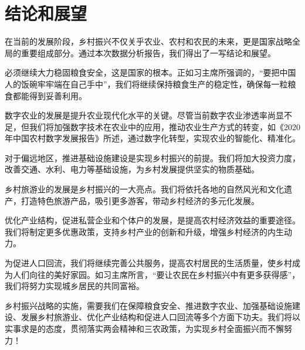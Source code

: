 \chapter{结论和展望}
\label{chapter:conclusion}

在当前的发展阶段，乡村振兴不仅关乎农业、农村和农民的未来，更是国家战略全局的重要组成部分。通过本次数据分析报告，我们得出了一写结论和展望。

必须继续大力稳固粮食安全，这是国家的根本。正如习主席所强调的，“要把中国人的饭碗牢牢端在自己手中”，我们将继续保持粮食生产的稳定性，确保每一粒粮食都能得到妥善利用。

数字农业的发展是提升农业现代化水平的关键。尽管当前数字农业渗透率尚显不足，但我们将加强数字技术在农业中的应用，推动农业生产方式的转变，如《2020年中国农村数字发展报告》所述，通过数字化转型，实现农业的智能化、精准化。

对于偏远地区，推进基础设施建设是实现乡村振兴的前提。我们将加大投资力度，改善交通、水利、电力等基础设施，为乡村发展提供坚实的物质基础。

乡村旅游业的发展是乡村振兴的一大亮点。我们将依托各地的自然风光和文化遗产，打造特色旅游产品，吸引更多游客，带动乡村经济的多元化发展。

优化产业结构，促进私营企业和个体户的发展，是提高农村经济效益的重要途径。我们将制定更多优惠政策，支持乡村产业的创新和升级，增强乡村经济的内生动力。

为促进人口回流，我们将继续完善公共服务，提高农村居民的生活质量，使乡村成为人们向往的美好家园。如习主席所言，“要让农民在乡村振兴中有更多获得感”，我们将努力实现城乡居民的共同富裕。

乡村振兴战略的实施，需要我们在保障粮食安全、推进数字农业、加强基础设施建设、发展乡村旅游业、优化产业结构和促进人口回流等多个方面下功夫。我们将以实事求是的态度，贯彻落实两会精神和三农政策，为实现乡村全面振兴而不懈努力！



